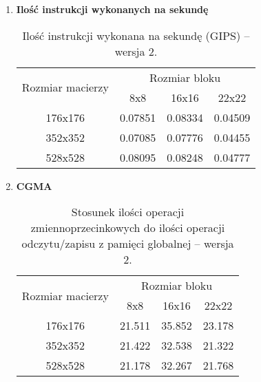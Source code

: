\begin{enumerate}
\item \textbf{Ilość instrukcji wykonanych na sekundę} \newline

\begin{table}[H]
\centering
\begin{tabular}{|c|c|c|c|}
\hline
\multirow{2}{*}{Rozmiar macierzy} & \multicolumn{3}{c|}{Rozmiar bloku} \\ \cline{2-4}
& 8x8 & 16x16 & 22x22 \\ \hline
176x176 & 0.07851 & 0.08334 & 0.04509 \\ \hline
352x352 & 0.07085 & 0.07776 & 0.04455 \\ \hline
528x528 & 0.08095 & 0.08248 & 0.04777 \\ \hline
\end{tabular}
\caption{Ilość instrukcji wykonana na sekundę (GIPS) -- wersja 2.}
\end{table}

\item \textbf{CGMA} \newline

\begin{table}[H]
\centering
\begin{tabular}{|c|c|c|c|}
\hline
\multirow{2}{*}{Rozmiar macierzy} & \multicolumn{3}{c|}{Rozmiar bloku} \\ \cline{2-4}
& 8x8 & 16x16 & 22x22 \\ \hline
176x176 & 21.511 & 35.852 & 23.178 \\ \hline
352x352 & 21.422 & 32.538 & 21.322 \\ \hline
528x528 & 21.178 & 32.267 & 21.768 \\ \hline
\end{tabular}
\caption{Stosunek ilości operacji zmiennoprzecinkowych do ilości operacji odczytu/zapisu z pamięci globalnej -- wersja 2.}
\end{table}

\end{enumerate}
